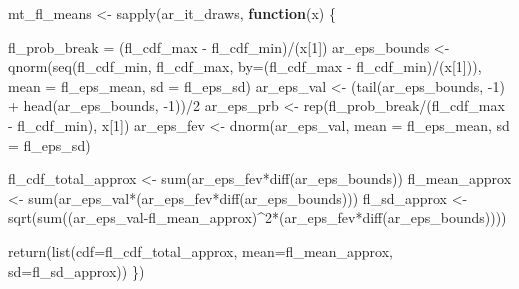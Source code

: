 \documentclass[
]{book}
\newenvironment{Shaded}{\begin{snugshade}}{\end{snugshade}}
\newcommand{\AttributeTok}[1]{\textcolor[rgb]{0.77,0.63,0.00}{#1}}
\newcommand{\ControlFlowTok}[1]{\textcolor[rgb]{0.13,0.29,0.53}{\textbf{#1}}}
\newcommand{\DecValTok}[1]{\textcolor[rgb]{0.00,0.00,0.81}{#1}}
\newcommand{\FunctionTok}[1]{\textcolor[rgb]{0.00,0.00,0.00}{#1}}
\newcommand{\NormalTok}[1]{#1}
\newcommand{\OtherTok}[1]{\textcolor[rgb]{0.56,0.35,0.01}{#1}}
\newcommand{\SpecialCharTok}[1]{\textcolor[rgb]{0.00,0.00,0.00}{#1}}
\begin{document}
\begin{Shaded}
\begin{Highlighting}[]
\NormalTok{mt\_fl\_means }\OtherTok{\textless{}{-}}
  \FunctionTok{sapply}\NormalTok{(ar\_it\_draws, }\ControlFlowTok{function}\NormalTok{(x) \{}

\NormalTok{    fl\_prob\_break }\OtherTok{=}\NormalTok{ (fl\_cdf\_max }\SpecialCharTok{{-}}\NormalTok{ fl\_cdf\_min)}\SpecialCharTok{/}\NormalTok{(x[}\DecValTok{1}\NormalTok{])}
\NormalTok{    ar\_eps\_bounds }\OtherTok{\textless{}{-}} \FunctionTok{qnorm}\NormalTok{(}\FunctionTok{seq}\NormalTok{(fl\_cdf\_min, fl\_cdf\_max,}
                               \AttributeTok{by=}\NormalTok{(fl\_cdf\_max }\SpecialCharTok{{-}}\NormalTok{ fl\_cdf\_min)}\SpecialCharTok{/}\NormalTok{(x[}\DecValTok{1}\NormalTok{])),}
                           \AttributeTok{mean =}\NormalTok{ fl\_eps\_mean, }\AttributeTok{sd =}\NormalTok{ fl\_eps\_sd)}
\NormalTok{    ar\_eps\_val }\OtherTok{\textless{}{-}}\NormalTok{ (}\FunctionTok{tail}\NormalTok{(ar\_eps\_bounds, }\SpecialCharTok{{-}}\DecValTok{1}\NormalTok{) }\SpecialCharTok{+} \FunctionTok{head}\NormalTok{(ar\_eps\_bounds, }\SpecialCharTok{{-}}\DecValTok{1}\NormalTok{))}\SpecialCharTok{/}\DecValTok{2}
\NormalTok{    ar\_eps\_prb }\OtherTok{\textless{}{-}} \FunctionTok{rep}\NormalTok{(fl\_prob\_break}\SpecialCharTok{/}\NormalTok{(fl\_cdf\_max }\SpecialCharTok{{-}}\NormalTok{ fl\_cdf\_min), x[}\DecValTok{1}\NormalTok{])}
\NormalTok{    ar\_eps\_fev }\OtherTok{\textless{}{-}} \FunctionTok{dnorm}\NormalTok{(ar\_eps\_val,}
                        \AttributeTok{mean =}\NormalTok{ fl\_eps\_mean, }\AttributeTok{sd =}\NormalTok{ fl\_eps\_sd)}

\NormalTok{    fl\_cdf\_total\_approx }\OtherTok{\textless{}{-}} \FunctionTok{sum}\NormalTok{(ar\_eps\_fev}\SpecialCharTok{*}\FunctionTok{diff}\NormalTok{(ar\_eps\_bounds))}
\NormalTok{    fl\_mean\_approx }\OtherTok{\textless{}{-}} \FunctionTok{sum}\NormalTok{(ar\_eps\_val}\SpecialCharTok{*}\NormalTok{(ar\_eps\_fev}\SpecialCharTok{*}\FunctionTok{diff}\NormalTok{(ar\_eps\_bounds)))}
\NormalTok{    fl\_sd\_approx }\OtherTok{\textless{}{-}} \FunctionTok{sqrt}\NormalTok{(}\FunctionTok{sum}\NormalTok{((ar\_eps\_val}\SpecialCharTok{{-}}\NormalTok{fl\_mean\_approx)}\SpecialCharTok{\^{}}\DecValTok{2}\SpecialCharTok{*}\NormalTok{(ar\_eps\_fev}\SpecialCharTok{*}\FunctionTok{diff}\NormalTok{(ar\_eps\_bounds))))}

    \FunctionTok{return}\NormalTok{(}\FunctionTok{list}\NormalTok{(}\AttributeTok{cdf=}\NormalTok{fl\_cdf\_total\_approx, }\AttributeTok{mean=}\NormalTok{fl\_mean\_approx, }\AttributeTok{sd=}\NormalTok{fl\_sd\_approx))}
\NormalTok{  \})}


\end{Highlighting}
\end{Shaded}
\end{document}
